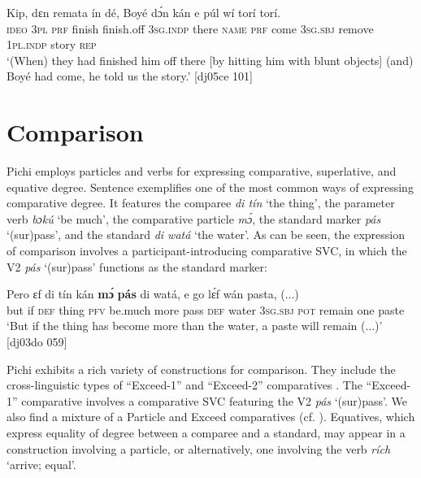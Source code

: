 \ea%
    \label{ex:key:465}
    \gll Kip,  dɛn      remata    ín    dé,    Boyé  dɔ́n  kán
e    púl    wí    torí    torí.\\
\textsc{ideo}  \textsc{3pl}  \textsc{prf}  finish  finish.off    \textsc{3sg.indp}  there  \textsc{name}  \textsc{prf}  come
\textsc{3sg.sbj}  remove  \textsc{1pl.indp}  story   \textsc{rep}\\

\glt ‘(When) they had finished him off there [by hitting him with blunt objects] 
(and) Boyé had come, he told us the story.’ [dj05ce 101]
\z

\section{Comparison}\label{sec:6.9}

Pichi employs particles and verbs for expressing comparative, superlative, and equative degree. Sentence  exemplifies one of the most common ways of expressing comparative degree. It features the comparee \textit{di tín} ‘the thing’, the parameter verb \textit{bɔkú} ‘be much’, the comparative particle \textit{mɔ́}, the standard marker \textit{pás} ‘(sur)pass’, and the standard \textit{di watá} ‘the water’. As can be seen, the expression of comparison involves a participant-introducing\index{} comparative SVC, in which the V2 \textit{pás} ‘(sur)pass’ functions as the standard marker: 


\ea%
    \label{ex:key:466}
    \gll Pero    ɛf  di  tín    kán      \textbf{mɔ́}    \textbf{pás}\textstylePichiexamplebold{} di  watá,
e    go  lɛ́f    wán  pasta,  (...)\\
but    if  \textsc{def}  thing  \textsc{pfv}    be.much  more  pass    \textsc{def}  water
\textsc{3sg.sbj}  \textsc{pot}  remain  one  paste\\

\glt ‘But if the thing has become more than the water, a paste
will remain (...)’ [dj03do 059]
\z

Pichi exhibits a rich variety of constructions for comparison. They include the cross-linguistic types of “Exceed-1” and “Exceed-2” comparatives \citep{Stassen1985}. The “Exceed-1” comparative involves a comparative SVC featuring the V2 \textit{pás} ‘(sur)pass’. We also find a mixture of a Particle and Exceed comparatives (cf. ). Equatives, which express equality of degree between a comparee and a standard, may appear in a construction involving a particle, or alternatively, one involving the verb \textit{rích} ‘arrive; equal’.

